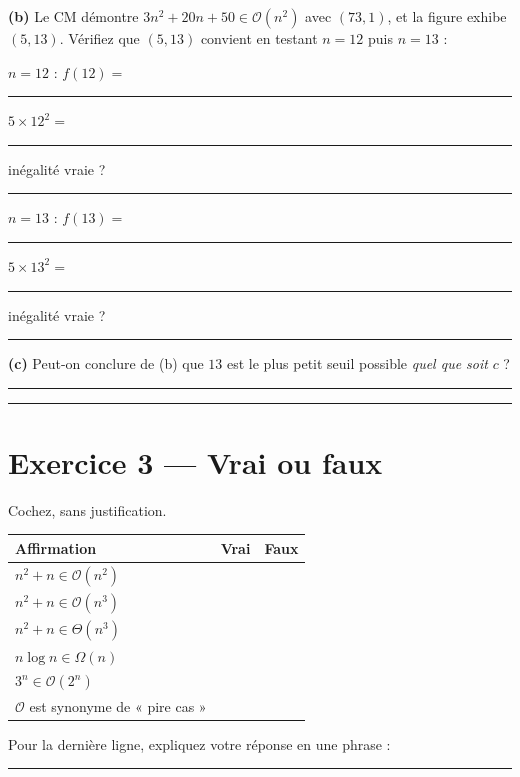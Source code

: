 \documentclass[11pt,a4paper]{article}
\newcommand{\bigO}{\mathcal{O}}
\newcommand{\bigOmega}{\Omega}
\newcommand{\bigTheta}{\Theta}
\newcommand{\lig}[1]{\rule{#1}{0.4pt}}
\begin{document}
\vspace{0.3cm}
\noindent\textbf{(b)} Le CM démontre $3n^2 + 20n + 50 \in \bigO(n^2)$ avec
$(73, 1)$, et la figure exhibe $(5, 13)$. Vérifiez que $(5, 13)$ convient
en testant $n = 12$ puis $n = 13$ :

\vspace{0.2cm}
$n = 12$ : $f(12) = $ \lig{2.5cm} \quad $5 \times 12^2 = $ \lig{2.5cm}
\quad inégalité vraie ? \lig{2cm}

\vspace{0.2cm}
$n = 13$ : $f(13) = $ \lig{2.5cm} \quad $5 \times 13^2 = $ \lig{2.5cm}
\quad inégalité vraie ? \lig{2cm}

\vspace{0.3cm}
\noindent\textbf{(c)} Peut-on conclure de (b) que $13$ est le plus petit
seuil possible \emph{quel que soit} $c$ ? \lig{7cm}

\vspace{0.2cm}
\noindent\lig{14cm}

\section{Exercice 3 --- Vrai ou faux}

Cochez, sans justification.

\vspace{0.3cm}
\begin{center}
\begin{tabular}{lcc}
\toprule
\textbf{Affirmation} & \textbf{Vrai} & \textbf{Faux} \\
\midrule
$n^2 + n \in \bigO(n^2)$                      & \rule{0pt}{0.7cm} & \\
$n^2 + n \in \bigO(n^3)$                      & \rule{0pt}{0.7cm} & \\
$n^2 + n \in \bigTheta(n^3)$                  & \rule{0pt}{0.7cm} & \\
$n \log n \in \bigOmega(n)$                   & \rule{0pt}{0.7cm} & \\
$3^n \in \bigO(2^n)$                          & \rule{0pt}{0.7cm} & \\
$\bigO$ est synonyme de « pire cas »          & \rule{0pt}{0.7cm} & \\
\bottomrule
\end{tabular}
\end{center}

\vspace{0.3cm}
\noindent Pour la dernière ligne, expliquez votre réponse en une phrase :
\lig{10cm}
\end{document}
